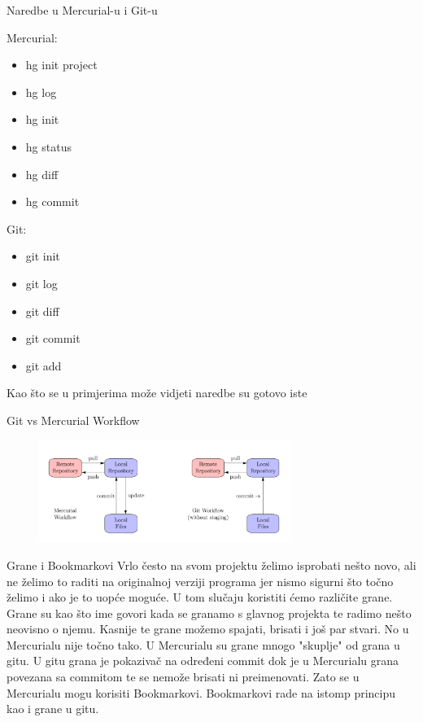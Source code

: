 \documentclass{beamer}
\begin{document}
\begin{frame}{Naredbe u Mercurial-u i Git-u}
\begin{multicols}{2}
Mercurial: \newline
\begin{itemize}
    \item hg init project
    \item hg log
    \item hg init
    \item hg status
    \item hg diff 
    \item hg commit
\end{itemize}

\columnbreak
Git: \newline
\begin{itemize}
    \item git init
    \item git log
    \item git diff
    \item git commit
    \item git add
\end{itemize}
\end{multicols}
Kao što se u primjerima može vidjeti naredbe su gotovo iste
\end{frame}

\begin{frame}{Git vs Mercurial Workflow}
\begin{figure}
    \centering
    \includegraphics[width = 310px]{workflows.png}
    \label{fig:my_label}
\end{figure}
\end{frame}

\begin{frame}{Grane i Bookmarkovi}
Vrlo često na svom projektu želimo isprobati nešto novo, ali ne želimo to raditi na originalnoj verziji programa jer nismo sigurni što točno želimo i ako je to uopće moguće. U tom slučaju koristiti ćemo različite grane. Grane su kao što ime govori kada se granamo s glavnog projekta te radimo nešto neovisno o njemu. Kasnije te grane možemo spajati, brisati i još par stvari. No u Mercurialu nije točno tako. U Mercurialu su grane mnogo "skuplje" od grana u gitu. U gitu grana je pokazivač na određeni commit dok je u Mercurialu grana povezana sa commitom te se nemože brisati ni preimenovati. Zato se u Mercurialu mogu korisiti Bookmarkovi. Bookmarkovi rade na istomp principu kao i grane u gitu.
\end{frame}
\end{document}
